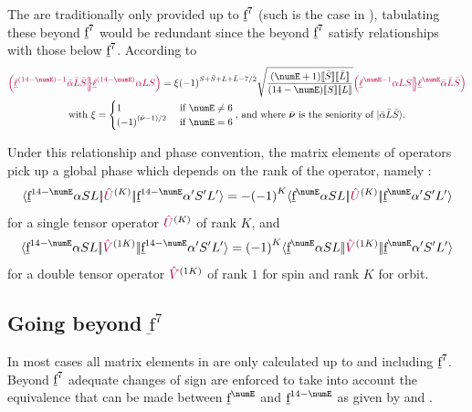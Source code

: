 \documentclass[11pt, twoside,openright]{article}
\begin{document}


The \cfps are traditionally only provided up to $\underbar{\text{f}}^7$ (such is the case in ), tabulating these beyond $\underbar{\text{f}}^7$ would be redundant since the \cfps beyond $\underbar{\text{f}}^7$ satisfy relationships with those below $\underbar{\text{f}}^7$. According to \cite{nielson_spectroscopic_1963}
\begin{multline}
\cfp{\lorb^{(14 - \numE)-1}\bar{\alpha}\bar{L}\bar{S}}
			{\lorb^{(14-\numE)}\alpha{LS}} =
			\xi
			\phaser{S+\bar{S}+L+\bar{L}-7/2}
			\sqrt{\frac{(\numE+1)\tpobraket{\bar{S}}\tpobraket{{\bar{L}}}}{(14-\numE)\tpobraket{S}\tpobraket{L}}}
			\cfp{\lorb^{\numE-1}\alpha{LS}}
			{\lorb^{\numE}\bar{\alpha}\bar{L}\bar{S}} \\
\text{with }\xi = \begin{cases}
1 & \text{ if }\numE \neq 6 \\
\phaser{(\bar{\senior} - 1)/2} & \text{ if }\numE = 6
\end{cases}	\text{, and where  $\bar{\senior}$ is the seniority of $\ket{\bar{\alpha} \bar{L}\bar{S} }$.}
\end{multline}

Under this relationship and phase convention, the matrix elements of operators pick up a global phase which depends on the rank of the operator, namely \cite{nielson_spectroscopic_1963}:
\begin{equation}
\redbraopket{\forb^{14-\numE}\alpha{SL}}{\op{U}^{(K)}}{\forb^{14-\numE}\alpha'{S'L'}} = -\phaser{K} \redbraopket{\forb^{\numE}\alpha{SL}}{\op{U}^{(K)}}{\forb^{\numE}\alpha'{S'L'}}
\label{eqn:sign change tensor op}
\end{equation}
for a single tensor operator $\textcolor{purple}{\hat{U}}^{(K)}$ of rank $K$, and
\begin{equation}
\redbraopket{\forb^{14-\numE}\alpha{SL}}{\op{V}^{(1K)}}{\forb^{14-\numE}\alpha'{S'L'}} = \phaser{K} \redbraopket{\forb^{\numE}\alpha{SL}}{\op{V}^{(1K)}}{\forb^{\numE}\alpha'{S'L'}}
\label{eqn:sign change double tensor op}
\end{equation}
for a double tensor operator $\textcolor{purple}{\hat{V}}^{(1K)}$ of rank $1$ for spin and rank $K$ for orbit.

\subsection{Going beyond $\underbar{\text{f}}^7$}

In most cases all matrix elements in \qlanth are only calculated up to and including $\underbar{\text{f}}^7$. Beyond $\underbar{\text{f}}^7$ adequate changes of sign are enforced to take into account the equivalence that can be made between $\forb^{\numE}$ and $\forb^{14-\numE}$ as given by  and . 
\end{document}
